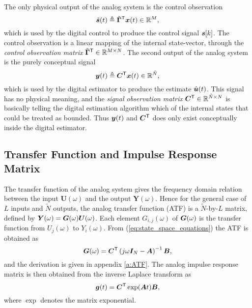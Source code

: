 The only physical output of the analog system is the control observation
\begin{equation}
    \label{eq:def_control_observation}
    \tilde{\bm{s}}(t) \triangleq \tilde{\bm{\Gamma}}^\mathsf{T} \bm{x}(t) \in \mathbb{R}^{M},
\end{equation}
which is used by the digital control to produce the control signal $\bm{s}[k]$. The control observation is a linear mapping of the internal state-vector, through the \textit{control observation matrix} $\tilde{\bm{\Gamma}}^\mathsf{T} \in \mathbb{R}^{M \times N}$.
The second output of the analog system is the purely conceptual signal
\begin{equation}
    \label{eq:def_as_output}
    \bm{y}(t) \triangleq \bm{C}^\mathsf{T} \bm{x}(t) \in \mathbb{R}^{\tilde{N}},
\end{equation}
 which is used by the digital estimator to produce the estimate $\hat{\bm{u}}(t)$. This signal has no physical meaning, and the \textit{signal observation matrix} $\bm{C}^\mathsf{T} \in \mathbb{R}^{\tilde{N} \times N}$ is basically telling the digital estimation algorithm which of the internal states that could be treated as bounded. Thus $\bm{y}(t)$ and $\bm{C}^\mathsf{T}$ does only exist conceptually inside the digital estimator.

\subsection{Transfer Function and Impulse Response Matrix}
\label{sec:as_tf}
The transfer function of the analog system gives the frequency domain relation between the input $\bm{U}(\omega)$ and the output $\bm{Y}(\omega)$. Hence for the general case of $L$ inputs and $\tilde{N}$ outputs, the analog transfer function (ATF) is a $\tilde{N}$-by-$L$ matrix, defined by $\bm{Y}(\omega) = \bm{G}(\omega) \bm{U}(\omega)$. Each element $G_{i,j}(\omega)$ of $\bm{G}(\omega)$ is the transfer function from $U_j(\omega)$ to $Y_i(\omega)$. From (\ref{eq:state_space_equations}) the ATF is obtained as
\begin{equation}
    \label{eq:ATF_def}
    \bm{G}(\omega) = \bm{C}^\mathsf{T}\left(j\omega \bm{I}_{N} - \bm{A} \right)^{-1}\bm{B},
\end{equation}
and the derivation is given in appendix \ref{a:ATF}. The analog impulse response matrix is then obtained from the inverse Laplace transform as
\begin{equation}
    \bm{g}(t) = \bm{C}^\mathsf{T} \exp(\bm{A} t) \bm{B},
\end{equation}
where $\exp$ denotes the matrix exponential.






























